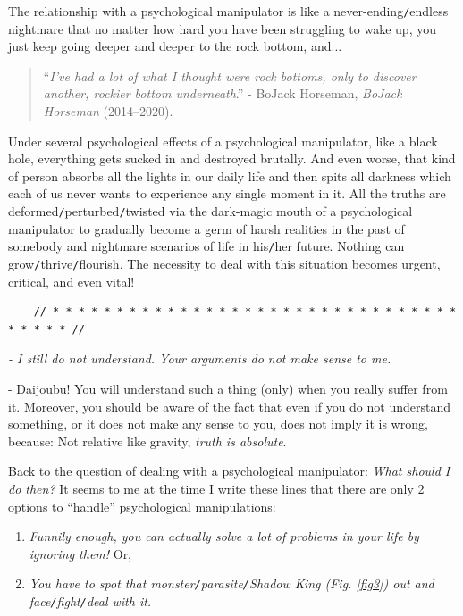 \documentclass[12pt]{article}
\begin{document}
The relationship with a psychological manipulator is like a never-ending{\tt/}endless nightmare that no matter how hard you have been struggling to wake up, you just keep going deeper and deeper to the rock bottom, and$\ldots$
\begin{quotation}
	``{\it I've had a lot of what I thought were rock bottoms, only to discover another, rockier bottom underneath}.'' - BoJack Horseman, {\it BoJack Horseman} (2014--2020).
\end{quotation}
Under several psychological effects of a psychological manipulator, like a black hole, everything gets sucked in and destroyed brutally. And even worse, that kind of person absorbs all the lights in our daily life and then spits all darkness which each of us never wants to experience any single moment in it. All the truths are deformed{\tt/}perturbed{\tt/}twisted via the dark-magic mouth of a psychological manipulator to gradually become a germ of harsh realities in the past of somebody and nightmare scenarios of life in his{\tt/}her future. Nothing can grow{\tt/}thrive{\tt/}flourish. The necessity to deal with this situation becomes urgent, critical, and even vital!

\begin{verbatim}
	// * * * * * * * * * * * * * * * * * * * * * * * * * * * * * * * * * * * * * //
\end{verbatim}

\noindent
{} {\it - I still do not understand. Your arguments do not make sense to me.}

- Daijoubu! You will understand such a thing (only) when you really suffer from it. Moreover, you should be aware of the fact that even if you do not understand something, or it does not make any sense to you, does not imply it is wrong, because: Not relative like gravity, {\it truth is absolute}.

Back to the question of dealing with a psychological manipulator: {\it What should I do then?} It seems to me at the time I write these lines that there are only 2 options to ``handle'' psychological manipulations:
\begin{enumerate}
	\item {\it Funnily enough, you can actually solve a lot of problems in your life by ignoring them!} Or,
	\item {\it You have to spot that monster{\tt/}parasite{\tt/}Shadow King (Fig. \ref{fig3}) out and face{\tt/}fight{\tt/}deal with it.}
\end{enumerate}
\end{document}
